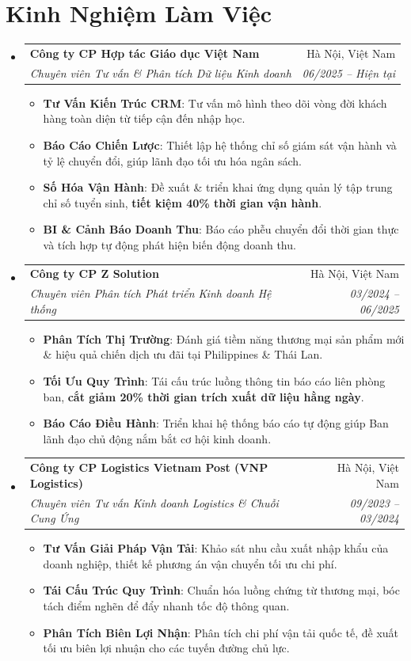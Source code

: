 \documentclass[letterpaper,11pt]{article}
\makeatletter
\newcommand{\resumeItem}[1]{
  \item\small{
    {#1 \vspace{1pt}}
  }
}
\newcommand{\resumeSubheading}[4]{
  \vspace{2pt}\item
    \begin{tabular*}{\textwidth}[t]{l@{\extracolsep{\fill}}r}
      \textbf{#1} & #2 \\
      \textit{\small#3} & \textit{\small #4} \\
    \end{tabular*}\vspace{-2pt}
}
\newcommand{\resumeSubHeadingListStart}{\begin{itemize}[leftmargin=0.15in, label={}]}
\newcommand{\resumeSubHeadingListEnd}{\end{itemize}}
\newcommand{\resumeItemListStart}{\begin{itemize}[leftmargin=0.15in, itemsep=2.5pt, topsep=2pt, parsep=1.5pt]}
\newcommand{\resumeItemListEnd}{\end{itemize}\vspace{2pt}}
\makeatother
\begin{document}
\section*{Kinh Nghiệm Làm Việc}
  \resumeSubHeadingListStart
    \resumeSubheading
      {Công ty CP Hợp tác Giáo dục Việt Nam}{Hà Nội, Việt Nam}
      {Chuyên viên Tư vấn \& Phân tích Dữ liệu Kinh doanh}{06/2025 -- Hiện tại}
      \resumeItemListStart
      \resumeItem{\textbf{Tư Vấn Kiến Trúc CRM}: Tư vấn mô hình theo dõi vòng đời khách hàng toàn diện từ tiếp cận đến nhập học.}
      \resumeItem{\textbf{Báo Cáo Chiến Lược}: Thiết lập hệ thống chỉ số giám sát vận hành và tỷ lệ chuyển đổi, giúp lãnh đạo tối ưu hóa ngân sách.}
      \resumeItem{\textbf{Số Hóa Vận Hành}: Đề xuất \& triển khai ứng dụng quản lý tập trung chỉ số tuyển sinh, \textbf{tiết kiệm 40\% thời gian vận hành}.}
      \resumeItem{\textbf{BI \& Cảnh Báo Doanh Thu}: Báo cáo phễu chuyển đổi thời gian thực và tích hợp tự động phát hiện biến động doanh thu.}
      \resumeItemListEnd
    \resumeSubheading
      {Công ty CP Z Solution}{Hà Nội, Việt Nam}
      {Chuyên viên Phân tích Phát triển Kinh doanh Hệ thống}{03/2024 -- 06/2025}
      \resumeItemListStart
      \resumeItem{\textbf{Phân Tích Thị Trường}: Đánh giá tiềm năng thương mại sản phẩm mới \& hiệu quả chiến dịch ưu đãi tại Philippines \& Thái Lan.}
      \resumeItem{\textbf{Tối Ưu Quy Trình}: Tái cấu trúc luồng thông tin báo cáo liên phòng ban, \textbf{cắt giảm 20\% thời gian trích xuất dữ liệu hằng ngày}.}
      \resumeItem{\textbf{Báo Cáo Điều Hành}: Triển khai hệ thống báo cáo tự động giúp Ban lãnh đạo chủ động nắm bắt cơ hội kinh doanh.}
      \resumeItemListEnd
    \resumeSubheading
      {Công ty CP Logistics Vietnam Post (VNP Logistics)}{Hà Nội, Việt Nam}
      {Chuyên viên Tư vấn Kinh doanh Logistics \& Chuỗi Cung Ứng}{09/2023 -- 03/2024}
      \resumeItemListStart
      \resumeItem{\textbf{Tư Vấn Giải Pháp Vận Tải}: Khảo sát nhu cầu xuất nhập khẩu của doanh nghiệp, thiết kế phương án vận chuyển tối ưu chi phí.}
      \resumeItem{\textbf{Tái Cấu Trúc Quy Trình}: Chuẩn hóa luồng chứng từ thương mại, bóc tách điểm nghẽn để đẩy nhanh tốc độ thông quan.}
      \resumeItem{\textbf{Phân Tích Biên Lợi Nhận}: Phân tích chi phí vận tải quốc tế, đề xuất tối ưu biên lợi nhuận cho các tuyến đường chủ lực.}
      \resumeItemListEnd
  \resumeSubHeadingListEnd

\end{document}
